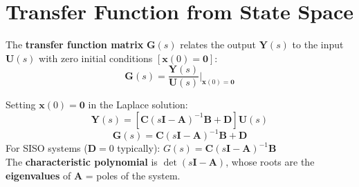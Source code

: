 \documentclass[12pt,a4paper]{article}
\begin{document}
\section{Transfer Function from State Space}

\begin{tcolorbox}[defbox]
The \textbf{transfer function matrix} $\mathbf{G}(s)$ relates the output $\mathbf{Y}(s)$ to the input $\mathbf{U}(s)$ with zero initial conditions $[\mathbf{x}(0) = \mathbf{0}]$:
$$\mathbf{G}(s) = \frac{\mathbf{Y}(s)}{\mathbf{U}(s)}\bigg|_{\mathbf{x}(0)=\mathbf{0}}$$
\end{tcolorbox}

\begin{tcolorbox}[formulabox, title={Transfer Function from State Space (Zero I.C.)}]
Setting $\mathbf{x}(0) = \mathbf{0}$ in the Laplace solution:
$$\mathbf{Y}(s) = \left[\mathbf{C}(s\mathbf{I}-\mathbf{A})^{-1}\mathbf{B} + \mathbf{D}\right]\mathbf{U}(s)$$
$$\boxed{\mathbf{G}(s) = \mathbf{C}(s\mathbf{I}-\mathbf{A})^{-1}\mathbf{B} + \mathbf{D}}$$
For SISO systems ($\mathbf{D}=0$ typically): $G(s) = \mathbf{C}(s\mathbf{I}-\mathbf{A})^{-1}\mathbf{B}$\\[4pt]
The \textbf{characteristic polynomial} is $\det(s\mathbf{I}-\mathbf{A})$, whose roots are the \textbf{eigenvalues} of $\mathbf{A}$ = poles of the system.
\end{tcolorbox}
\end{document}
